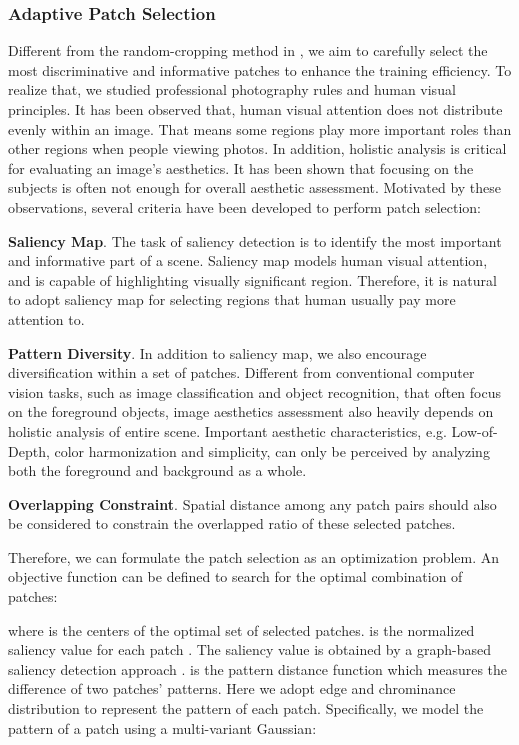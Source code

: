 \documentclass[10pt,twocolumn,letterpaper]{article}
\begin{document}
	\subsubsection{Adaptive Patch Selection}
	Different from the random-cropping method in \cite{Lu:2015:ICCV}, we aim to carefully select the most discriminative and informative patches to enhance the training efficiency. To realize that, we studied professional photography rules and human visual principles. It has been observed that, human visual attention does not distribute evenly within an image. That means some regions play more important roles than other regions when people viewing photos. In addition, holistic analysis is critical for evaluating an image's aesthetics. It has been shown that focusing on the subjects is often not enough for overall aesthetic assessment. Motivated by these observations, several criteria have been developed to perform patch selection:
	
	\textbf{Saliency Map}. The task of saliency detection is to identify the most important and informative part of a scene. Saliency map models human visual attention, and is capable of highlighting visually significant region. Therefore, it is natural to adopt saliency map for selecting regions that human usually pay more attention to.
	
	\textbf{Pattern Diversity}. In addition to saliency map, we also encourage diversification within a set of patches. Different from conventional computer vision tasks, such as image classification and object recognition, that often focus on the foreground objects, image aesthetics assessment also heavily depends on holistic analysis of entire scene. Important aesthetic characteristics, e.g. Low-of-Depth, color harmonization and simplicity, can only be perceived by analyzing both the foreground and background as a whole. 
	
	\textbf{Overlapping Constraint}. Spatial distance among any patch pairs should also be considered to constrain the overlapped ratio of these selected patches. 
	
	Therefore, we can formulate the patch selection as an optimization problem.  An objective function can be defined to search for the optimal combination of patches:
	
	
	where  is the centers of the optimal set of  selected patches.  is the normalized saliency value for 
	each patch . The saliency value is obtained by a graph-based saliency detection approach \cite{C.Yang:2013:CVPR:graph_based_saliency}.
	 is the pattern distance function which 
	measures the difference of two patches' patterns. 
	Here we adopt edge and chrominance distribution to represent the pattern of each patch. Specifically, we model the pattern of a patch  using a multi-variant Gaussian:
	
\end{document}
